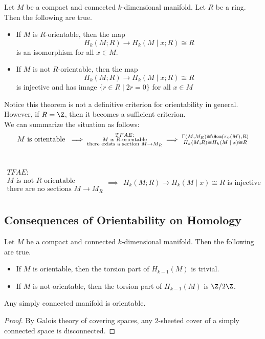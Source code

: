 \documentclass[a4paper]{article}
\begin{document}
\begin{thm}{}{} Let $M$ be a compact and connected $k$-dimensional manifold. Let $R$ be a ring. Then the following are true. 
\begin{itemize}
\item If $M$ is $R$-orientable, then the map $$H_k(M;R)\to H_k(M\;|\;x;R)\cong R$$ is an isomorphism for all $x\in M$. 
\item If $M$ is not $R$-orientable, then the map $$H_k(M;R)\to H_k(M\;|\;x;R)\cong R$$ is injective and has image $\{r\in R\;|\;2r=0\}$ for all $x\in M$
\end{itemize}
\end{thm}

Notice this theorem is not a definitive criterion for orientability in general. However, if $R=\Z$, then it becomes a sufficient criterion. \\

We can summarize the situation as follows: $$M\text{ is orientable }\implies\substack{TFAE:\\M\text{ is }R\text{-orientable}\\\text{there exists a section }M\to M_R\\}\implies\substack{\Gamma(M,M_R)\cong\Hom(\pi_0(M),R)\\H_k(M;R)\cong H_k(M\;|\;x)\cong R}$$~

$$\substack{TFAE:\\M\text{ is not }R\text{-orientable}\\\text{there are no sections }M\to M_R\\}\implies\substack{H_k(M;R)\longrightarrow H_k(M\;|\;x)\cong R\text{ is injective}}$$

\subsection{Consequences of Orientability on Homology}
\begin{crl}{}{} Let $M$ be a compact and connected $k$-dimensional manifold. Then the following are true. 
\begin{itemize}
\item If $M$ is orientable, then the torsion part of $H_{k-1}(M)$ is trivial. 
\item If $M$ is not-orientable, then the torsion part of $H_{k-1}(M)$ is $\Z/2\Z$. 
\end{itemize}
\end{crl}

\begin{crl}{}{} Any simply connected manifold is orientable. \tcbline
\begin{proof}
By Galois theory of covering spaces, any $2$-sheeted cover of a simply connected space is disconnected. 
\end{proof}
\end{crl}
\end{document}
